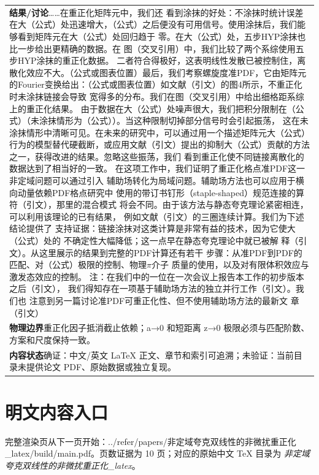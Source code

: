 \documentclass[UTF8,11pt,oneside]{ctexbook}
\begin{document}
\begin{table}[htbp]
\begin{tabular}{@{}p{}@{}}
    \textbf{结果/讨论}\quad ……在重正化矩阵元中，我们还 看到涂抹的好处：不涂抹时统计误差在大（公式）处迅速增大，（公式）之后便没有可用信号。使用涂抹后，我们能够看到矩阵元在大（公式）处回归趋于 零。在大（公式）处，五步HYP涂抹也比一步给出更精确的数据。在 图（交叉引用）中，我们比较了两个系综使用五步HYP涂抹的重正化数据。 二者符合得极好，这表明线性发散已被控制住，离散化效应不大。（公式或图表位置）最后，我们考察螺旋度准PDF，它由矩阵元的Fourier变换给出：（公式或图表位置）如文献（引文）的图4所示，不重正化时未涂抹链接会导致 宽得多的分布。我们在图（交叉引用）中给出细格距系综上的重正化结果。 由于数据在大（公式）处噪声很大，我们把积分限制在（公式）（未涂抹情形为（公式））。当这种限制切掉部分信号时会引起振荡， 这在未涂抹情形中清晰可见。在未来的研究中，可以通过用一个描述矩阵元大（公式）行为的模型替代硬截断，或应用文献（引文）提出的抑制大（公式）贡献的方法之一，获得改进的结果。忽略这些振荡，我们 看到重正化使不同链接离散化的数据达到了相当好的一致。 在这项工作中，我们证明了重正化格点准PDF这一非定域问题可以通过引入 辅助场转化为局域问题。辅助场方法也可以应用于横向动量依赖PDF格点研究中 使用的带订书钉形（staple-shaped）规范连接的算 符（引文），那里的混合模式 将会不同。由于该方法与静态夸克理论紧密相连，可以利用该理论的已有结果， 例如文献（引文）的三圈连续计算。我们为下述结论提供了 支持证据：链接涂抹对这类计算是非常有益的技术，因为它使大（公式）处的 不确定性大幅降低；这一点早在静态夸克理论中就已被解 释（引文）。从这里展示的结果到完整的PDF计算还有若干 步骤：从准PDF到PDF的匹配、对（公式）极限的控制、物理$\pi$介子 质量的使用，以及对有限体积效应与激发态效应的控制。 注：在我们中的一位在一次会议上报告本工作的初步版本之后（引文）， 我们得知存在一项基于辅助场方法的独立并行工作（引文）。我们也 注意到另一篇讨论准PDF可重正化性、但不使用辅助场方法的最新文 章（引文） \\
    \textbf{物理边界}\quad 重正化因子抵消截止依赖；a→0 和短距离 z→0 极限必须与匹配阶数、方案和尺度保持一致。 \\
    \textbf{内容状态}\quad 确证：中文/英文 LaTeX 正文、章节和索引可追溯；未验证：当前目录未提供论文 PDF、原始数据或独立复现。 \\
    \bottomrule
  \end{tabular}
\end{table}
\section*{明文内容入口}
\noindent 完整渲染页从下一页开始：../\allowbreak{}refer/\allowbreak{}papers/\allowbreak{}非定域夸克双线性的非微扰重正化\_\allowbreak{}latex/\allowbreak{}build/\allowbreak{}main.pdf。页数证据为 10 页；对应的原始中文 TeX 目录为 \emph{非定域夸克双线性的非微扰重正化\_latex}。
\clearpage

\clearpage
\end{document}
